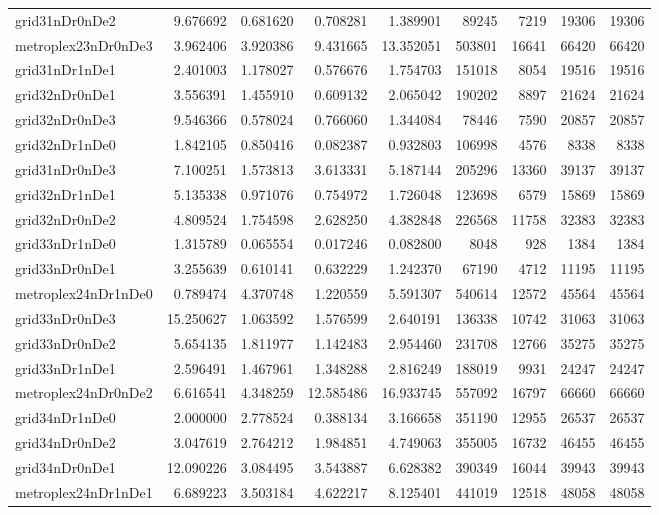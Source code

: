 \documentclass[../../../thesis.tex]{subfiles}
\begin{document}
\begin{longtable}{|l|r|r|r|r|r|r|r|r|}
grid31nDr0nDe2 & 9.676692 & 0.681620 & 0.708281 & 1.389901 & 89245 & 7219 & 19306 & 19306 \\
metroplex23nDr0nDe3 & 3.962406 & 3.920386 & 9.431665 & 13.352051 & 503801 & 16641 & 66420 & 66420 \\
grid31nDr1nDe1 & 2.401003 & 1.178027 & 0.576676 & 1.754703 & 151018 & 8054 & 19516 & 19516 \\
grid32nDr0nDe1 & 3.556391 & 1.455910 & 0.609132 & 2.065042 & 190202 & 8897 & 21624 & 21624 \\
grid32nDr0nDe3 & 9.546366 & 0.578024 & 0.766060 & 1.344084 & 78446 & 7590 & 20857 & 20857 \\
grid32nDr1nDe0 & 1.842105 & 0.850416 & 0.082387 & 0.932803 & 106998 & 4576 & 8338 & 8338 \\
grid31nDr0nDe3 & 7.100251 & 1.573813 & 3.613331 & 5.187144 & 205296 & 13360 & 39137 & 39137 \\
grid32nDr1nDe1 & 5.135338 & 0.971076 & 0.754972 & 1.726048 & 123698 & 6579 & 15869 & 15869 \\
grid32nDr0nDe2 & 4.809524 & 1.754598 & 2.628250 & 4.382848 & 226568 & 11758 & 32383 & 32383 \\
grid33nDr1nDe0 & 1.315789 & 0.065554 & 0.017246 & 0.082800 & 8048 & 928 & 1384 & 1384 \\
grid33nDr0nDe1 & 3.255639 & 0.610141 & 0.632229 & 1.242370 & 67190 & 4712 & 11195 & 11195 \\
metroplex24nDr1nDe0 & 0.789474 & 4.370748 & 1.220559 & 5.591307 & 540614 & 12572 & 45564 & 45564 \\
grid33nDr0nDe3 & 15.250627 & 1.063592 & 1.576599 & 2.640191 & 136338 & 10742 & 31063 & 31063 \\
grid33nDr0nDe2 & 5.654135 & 1.811977 & 1.142483 & 2.954460 & 231708 & 12766 & 35275 & 35275 \\
grid33nDr1nDe1 & 2.596491 & 1.467961 & 1.348288 & 2.816249 & 188019 & 9931 & 24247 & 24247 \\
metroplex24nDr0nDe2 & 6.616541 & 4.348259 & 12.585486 & 16.933745 & 557092 & 16797 & 66660 & 66660 \\
grid34nDr1nDe0 & 2.000000 & 2.778524 & 0.388134 & 3.166658 & 351190 & 12955 & 26537 & 26537 \\
grid34nDr0nDe2 & 3.047619 & 2.764212 & 1.984851 & 4.749063 & 355005 & 16732 & 46455 & 46455 \\
grid34nDr0nDe1 & 12.090226 & 3.084495 & 3.543887 & 6.628382 & 390349 & 16044 & 39943 & 39943 \\
metroplex24nDr1nDe1 & 6.689223 & 3.503184 & 4.622217 & 8.125401 & 441019 & 12518 & 48058 & 48058 \\

\end{longtable}
\end{document}
